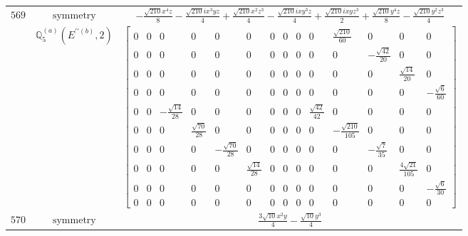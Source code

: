 \documentclass[fleqn,8pt,landscape]{jsarticle}
\begin{document}
\begin{longtable}{ccc}
$ 569 $ & $ \text{symmetry} $ & $ - \frac{\sqrt{210} x^{4} z}{8} - \frac{\sqrt{210} i x^{3} y z}{4} + \frac{\sqrt{210} x^{2} z^{3}}{4} - \frac{\sqrt{210} i x y^{3} z}{4} + \frac{\sqrt{210} i x y z^{3}}{2} + \frac{\sqrt{210} y^{4} z}{8} - \frac{\sqrt{210} y^{2} z^{3}}{4} $ \\
$  $ & $ \mathbb{Q}_{5}^{(a)}(E^{\prime\prime(b)},2) $ & $ \begin{bmatrix} 0 & 0 & 0 & 0 & 0 & 0 & 0 & 0 & 0 & 0 & \frac{\sqrt{210}}{60} & 0 & 0 & 0 \\ 0 & 0 & 0 & 0 & 0 & 0 & 0 & 0 & 0 & 0 & 0 & - \frac{\sqrt{42}}{20} & 0 & 0 \\ 0 & 0 & 0 & 0 & 0 & 0 & 0 & 0 & 0 & 0 & 0 & 0 & \frac{\sqrt{14}}{20} & 0 \\ 0 & 0 & 0 & 0 & 0 & 0 & 0 & 0 & 0 & 0 & 0 & 0 & 0 & - \frac{\sqrt{6}}{60} \\ 0 & 0 & - \frac{\sqrt{14}}{28} & 0 & 0 & 0 & 0 & 0 & 0 & \frac{\sqrt{42}}{42} & 0 & 0 & 0 & 0 \\ 0 & 0 & 0 & \frac{\sqrt{70}}{28} & 0 & 0 & 0 & 0 & 0 & 0 & - \frac{\sqrt{210}}{105} & 0 & 0 & 0 \\ 0 & 0 & 0 & 0 & - \frac{\sqrt{70}}{28} & 0 & 0 & 0 & 0 & 0 & 0 & - \frac{\sqrt{7}}{35} & 0 & 0 \\ 0 & 0 & 0 & 0 & 0 & \frac{\sqrt{14}}{28} & 0 & 0 & 0 & 0 & 0 & 0 & \frac{4 \sqrt{21}}{105} & 0 \\ 0 & 0 & 0 & 0 & 0 & 0 & 0 & 0 & 0 & 0 & 0 & 0 & 0 & - \frac{\sqrt{6}}{30} \\ 0 & 0 & 0 & 0 & 0 & 0 & 0 & 0 & 0 & 0 & 0 & 0 & 0 & 0 \end{bmatrix} $ \\ \hline
$ 570 $ & $ \text{symmetry} $ & $ \frac{3 \sqrt{10} x^{2} y}{4} - \frac{\sqrt{10} y^{3}}{4} $ \\

\end{longtable}
\end{document}
